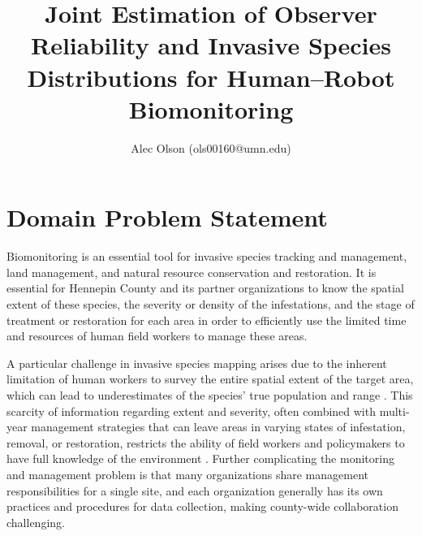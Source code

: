 \documentclass{article}
\begin{document}
\title{Joint Estimation of Observer Reliability and Invasive Species Distributions for Human–Robot Biomonitoring}

\author{Alec Olson (ols00160@umn.edu)}


\maketitle

\section{Domain Problem Statement}
Biomonitoring is an essential tool for invasive species tracking and management, land management, and natural resource conservation and restoration. It is essential for Hennepin County and its partner organizations to know the spatial extent of these species, the severity or density of the infestations, and the stage of treatment or restoration for each area in order to efficiently use the limited time and resources of human field workers to manage these areas.

A particular challenge in invasive species mapping arises due to the inherent limitation of human workers to survey the entire spatial extent of the target area, which can lead to underestimates of the species’ true population and range \cite{https://doi.org/10.1890/0012-9658}. This scarcity of information regarding extent and severity, often combined with multi-year management strategies that can leave areas in varying states of infestation, removal, or restoration, restricts the ability of field workers and policymakers to have full knowledge of the environment \cite{when-to-monitor-or-control}. Further complicating the monitoring and management problem is that many organizations share management responsibilities for a single site, and each organization generally has its own practices and procedures for data collection, making county-wide collaboration challenging.
\end{document}
